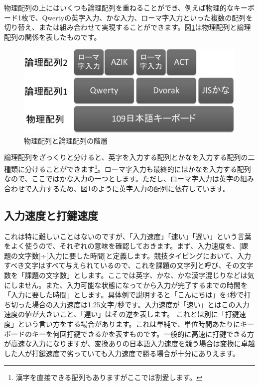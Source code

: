物理配列の上にはいくつも論理配列を重ねることができ、例えば物理的なキーボード1枚で、Qwertyの英字入力、かな入力、ローマ字入力といった複数の配列を切り替え、または組み合わせて実現することができます。図\ref{arrangement}は物理配列と論理配列の関係を表したものです。

\begin{figure}
 \begin{center}
   \includegraphics[width=14cm,clip]{res_tomoemon/arrangement.eps}
 \end{center}
 \caption{物理配列と論理配列の階層}
 \label{arrangement}
\end{figure}

論理配列をざっくりと分けると、英字を入力する配列とかなを入力する配列の二種類に分けることができます\footnote{漢字を直接できる配列もありますがここでは割愛します。}。ローマ字入力も最終的にはかなを入力する配列なので、ここではかな入力の一つとします。ただし、ローマ字入力は英字の組み合わせで入力するため、図\ref{arrangement}のように英字入力の配列に依存しています。

\subsection{入力速度と打鍵速度}

これは特に難しいことはないのですが、「入力速度」「速い」「遅い」という言葉をよく使うので、それぞれの意味を確認しておきます。まず、入力速度を、[課題の文字数]÷[入力に要した時間]と定義します。競技タイピングにおいて、入力すべき文字はすべて与えられているので、これを課題の文字列と呼び、その文字数を「課題の文字数」とします。ここでは英字、かな、かな漢字混じりなどは気にしません。また、入力可能な状態になってから入力が完了するまでの時間を「入力に要した時間」とします。具体例で説明すると「こんにちは」を4秒で打ち切った場合の入力速度は1.25文字/秒です。入力速度が「速い」とはこの入力速度の値が大きいこと、「遅い」はその逆を表します。
これとは別に「打鍵速度」という言い方をする場合があります。これは単純で、単位時間あたりにキーボードのキーを何回打鍵できるかを表すものです。一般的に高速に打鍵できる方が高速な入力になりますが、変換ありの日本語入力速度を競う場合は変換に卓越した人が打鍵速度で劣っていても入力速度で勝る場合が十分にありえます。

